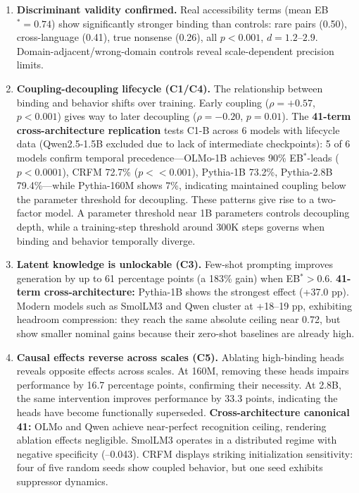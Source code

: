 \documentclass[10pt]{article} %
\begin{document}
\begin{enumerate}
  \item \textbf{Discriminant validity confirmed.} Real accessibility terms (mean EB$^*=0.74$) show significantly stronger binding than controls: rare pairs (0.50), cross-language (0.41), true nonsense (0.26), all $p<0.001$, $d=1.2$--$2.9$. Domain-adjacent/wrong-domain controls reveal scale-dependent precision limits.

  \item \textbf{Coupling-decoupling lifecycle (C1/C4).} The relationship between binding and behavior shifts over training. Early coupling ($\rho=+0.57$, $p<0.001$) gives way to later decoupling ($\rho=-0.20$, $p=0.01$).
  The \textbf{41-term cross-architecture replication} tests C1-B across 6 models with lifecycle data (Qwen2.5-1.5B excluded due to lack of intermediate checkpoints): 5 of 6 models confirm temporal precedence---OLMo-1B achieves 90\% EB$^*$-leads ($p<0.0001$), CRFM 72.7\% ($p<<0.001$), Pythia-1B 73.2\%, Pythia-2.8B 79.4\%---while Pythia-160M shows 7\%, indicating maintained coupling below the parameter threshold for decoupling.
  These patterns give rise to a two-factor model. A parameter threshold near 1B parameters controls decoupling depth, while a training-step threshold around 300K steps governs when binding and behavior temporally diverge.

  \item \textbf{Latent knowledge is unlockable (C3).} Few-shot prompting improves generation by up to 61 percentage points (a 183\% gain) when EB$^*>0.6$.
  \textbf{41-term cross-architecture:} Pythia-1B shows the strongest effect (+37.0 pp). Modern models such as SmolLM3 and Qwen cluster at +18--19 pp, exhibiting headroom compression: they reach the same absolute ceiling near 0.72, but show smaller nominal gains because their zero-shot baselines are already high.

  \item \textbf{Causal effects reverse across scales (C5).} Ablating high-binding heads reveals opposite effects across scales. At 160M, removing these heads impairs performance by 16.7 percentage points, confirming their necessity. At 2.8B, the same intervention improves performance by 33.3 points, indicating the heads have become functionally superseded.
  \textbf{Cross-architecture canonical 41:} OLMo and Qwen achieve near-perfect recognition ceiling, rendering ablation effects negligible. SmolLM3 operates in a distributed regime with negative specificity (--0.043). CRFM displays striking initialization sensitivity: four of five random seeds show coupled behavior, but one seed exhibits suppressor dynamics.
\end{enumerate}
\end{document}
